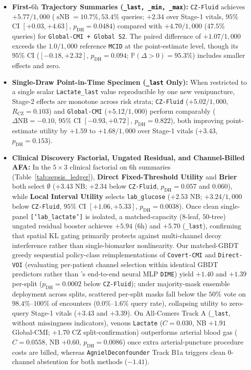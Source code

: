 \documentclass[11pt]{article}
\begin{document}
\begin{itemize}
  \item \textbf{First-$6\text{h}$ Trajectory Summaries (\texttt{\_last, \_min, \_max}):} \texttt{CZ-Fluid} achieves $\mathbf{+5.77}/1{,}000$ ($\operatorname{sNB}=10.7\%, 53.4\%$ queries; $+\mathbf{2.34}$ over Stage-1 vitals, $95\%$ CI $[+0.03, +4.63]$, $p_{\text{DH}}=0.0484$) compared with $+4.70/1{,}000$ ($47.5\%$ queries) for \texttt{Global-CMI + Global S2}. The paired difference of $\mathbf{+1.07}/1{,}000$ exceeds the $1.0/1{,}000$ reference \texttt{MCID} at the point-estimate level, though its $95\%$ CI ($[-0.18, +2.32]$, $p_{\text{DH}}=0.094$; $\mathbb{P}(\Delta>0)=95.3\%$) includes smaller effects and zero.
  \item \textbf{Single-Draw Point-in-Time Specimen (\texttt{\_last} Only):} When restricted to a single scalar \texttt{Lactate\_last} value reproducible by one new venipuncture, Stage-2 effects are monotone across risk strata; \texttt{CZ-Fluid} ($+5.02/1{,}000$, $R_{\text{CZ}}=0.103$) and \texttt{Global-CMI} ($+5.12/1{,}000$) perform comparably ($\Delta\text{NB} = -0.10$, $95\%$ CI $[-0.93, +0.72]$, $p_{\text{DH}}=0.822$), both improving point-estimate utility by $+1.59$ to $+1.68/1{,}000$ over Stage-1 vitals ($+3.43$, $p_{\text{DH}}=0.153$).
  \item \textbf{Clinical Discovery Factorial, Ungated Residual, and Channel-Billed AFA:} In the $5\times 3$ clinical factorial on $6\text{h}$ summaries (Table~\ref{tab:sepsis_ledger}), \textbf{Direct Fixed-Threshold Utility} and \textbf{Brier} both select $\emptyset$ ($+3.43$ NB; $+2.34$ below \texttt{CZ-Fluid}, $p_{\text{DH}}=0.057$ and $0.060$), while \textbf{Local Interval Utility} selects \texttt{lab\_glucose} ($+2.53$ NB; $\mathbf{+3.24}/1{,}000$ below \texttt{CZ-Fluid}, $95\%$ CI $[+1.06, +5.33]$, $p_{\text{DH}}=\mathbf{0.0038}$). Once clean single-panel \texttt{['lab\_lactate']} is isolated, a matched-capacity ($8$-leaf, $50$-tree) ungated residual booster achieves $+5.94$ ($6\text{h}$) and $+5.70$ (\texttt{\_last}), confirming that spatial KL gating primarily protects against multi-channel decoy interference rather than single-biomarker nonlinearity. Our matched-GBDT greedy sequential policy-class reimplementations of \texttt{Covert-CMI} \citep{covert2023learning} and \texttt{Direct-VOI} (evaluating per-patient channel selection within identical GBDT predictors rather than \citeauthor{covert2023learning}'s end-to-end neural MLP \texttt{DIME}) yield $+1.40$ and $+1.39$ per-split ($p_{\text{DH}}=0.0002$ below \texttt{CZ-Fluid}); under majority-mask ensemble deployment across splits, scattered per-split masks fall below the $50\%$ vote on $98.4\%\text{--}100\%$ of encounters ($0.0\%\text{--}1.6\%$ query rate), collapsing utility to zero-query Stage-1 vitals ($+3.43$ and $+3.39$). On All-Comers Track A (\texttt{\_last}, without missingness indicators), venous \texttt{Lactate} ($C=0.030$, NB $+1.91$ Global-CMI; $+1.70$ CZ split-confirmation) outperforms arterial blood gas ($C=0.0558$, NB $+0.60$, $p_{\text{DH}}=0.0086$) once extra arterial-puncture procedure costs are billed, whereas \texttt{AgnielDeconfounder} Track B1a triggers clean $0$-channel abstention for both methods ($-1.41$).
\end{itemize}
\end{document}
